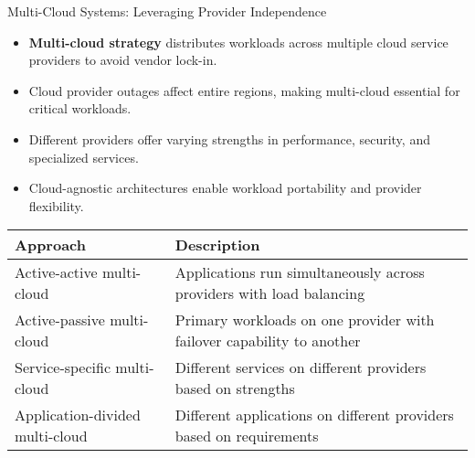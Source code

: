\documentclass{beamer}
\begin{document}
\begin{frame}{Multi-Cloud Systems: Leveraging Provider Independence}
    \begin{itemize}
        \item \textbf{Multi-cloud strategy} distributes workloads across multiple cloud service providers to avoid vendor lock-in.
        \item Cloud provider outages affect entire regions, making multi-cloud essential for critical workloads.
        \item Different providers offer varying strengths in performance, security, and specialized services.
        \item Cloud-agnostic architectures enable workload portability and provider flexibility.
    \end{itemize}
    
    \begin{table}
        \centering
        \small
        \begin{tabular}{p{3cm}p{7cm}}
            \toprule
            \textbf{Approach} & \textbf{Description} \\
            \midrule
            Active-active multi-cloud & Applications run simultaneously across providers with load balancing \\
            Active-passive multi-cloud & Primary workloads on one provider with failover capability to another \\
            Service-specific multi-cloud & Different services on different providers based on strengths \\
            Application-divided multi-cloud & Different applications on different providers based on requirements \\
            \bottomrule
        \end{tabular}
    \end{table}
\end{frame}
\end{document}

